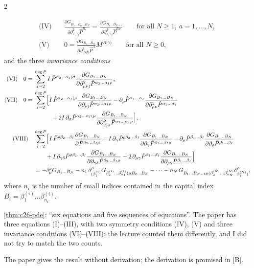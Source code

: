 \begin{paracol}{2}
\begin{theorem}
\begin{align*}
\text{(IV)}\quad&\frac{\partial G_{B_1\dots\widetilde{B_a}\dots B_N}}{\partial\partial^2_{\gamma_1\gamma_2}\hat P^{B_a}}=\frac{\partial G_{B_1\dots B_{N-1}}}{\partial\partial^2_{\gamma_1\gamma_2}\hat P^{B_N}}\qquad\text{for all }N\ge1,\ a=1,\dots,N,\\
\text{(V)}\quad&0=\frac{\partial G_{B_1\dots B_N}}{\partial\partial^2_{(\alpha\beta|}\hat P^A}M^{A|\gamma)}\qquad\text{for all }N\ge0,
\end{align*}
and the three \emph{invariance conditions}
\begin{align*}
\text{(VI)}\quad0={}&\sum_{I=2}^{\deg P}I\,\hat P^{\alpha_2\dots\alpha_I(\sigma}\frac{\partial G_{B_1\dots B_N}}{\partial\partial^2_{\mu\nu)}\hat P^{\alpha_2\dots\alpha_I\rho}},\\
\text{(VII)}\quad0={}&\sum_{I=2}^{\deg P}\Bigl[I\,\hat P^{\alpha_2\dots\alpha_I(\mu}\frac{\partial G_{B_1\dots B_N}}{\partial\partial_{\nu)}\hat P^{\alpha_2\dots\alpha_I\rho}}-\partial_\rho\hat P^{\alpha_1\dots\alpha_I}\frac{\partial G_{B_1\dots B_N}}{\partial\partial^2_{\mu\nu}\hat P^{\alpha_1\dots\alpha_I}}\\
&\qquad\quad+2I\,\partial_\sigma\hat P^{\alpha_2\dots\alpha_I(\mu}\frac{\partial G_{B_1\dots B_N}}{\partial\partial^2_{\nu)\sigma}\hat P^{\alpha_2\dots\alpha_I\rho}}\Bigr],\\
\text{(VIII)}\quad&\sum_{I=2}^{\deg P}\Bigl[I\,\hat P^{\rho\beta_2\dots\beta_I}\frac{\partial G_{B_1\dots B_N}}{\partial\hat P^{\beta_2\dots\beta_I\mu}}+I\,\partial_\gamma\hat P^{\rho\beta_2\dots\beta_I}\frac{\partial G_{B_1\dots B_N}}{\partial\partial_\gamma\hat P^{\beta_2\dots\beta_I\mu}}-\partial_\mu\hat P^{\beta_1\dots\beta_I}\frac{\partial G_{B_1\dots B_N}}{\partial\partial_\rho\hat P^{\beta_1\dots\beta_I}}\\
&\qquad+I\,\partial_{\gamma\delta}\hat P^{\rho\beta_2\dots\beta_I}\frac{\partial G_{B_1\dots B_N}}{\partial\partial_{\gamma\delta}\hat P^{\beta_2\dots\beta_I\mu}}-2\,\partial_{\mu\gamma}\hat P^{\beta_1\dots\beta_I}\frac{\partial G_{B_1\dots B_N}}{\partial\partial_{\rho\gamma}\hat P^{\beta_1\dots\beta_I}}\Bigr]\\
&=-\delta^\rho_\mu G_{B_1\dots B_N}-n_1\,\delta^\rho_{(\beta^{(1)}_1}G_{\beta^{(1)}_2\dots\beta^{(1)}_{n_1})\mu B_2\dots B_N}-\dots-n_N\,G_{B_1\dots B_{N-1}\mu(\beta^{(N)}_2\dots\beta^{(N)}_{n_N}}\delta^\rho_{\beta^{(N)}_1)},
\end{align*}
where $n_i$ is the number of small indices contained in the capital index $B_i=\beta^{(i)}_1\dots\beta^{(i)}_{n_i}$.
\end{theorem}
\begin{recall}
\cref{thm:c26-pde}: ``six equations and five sequences of equations''. The paper has three equations (I)--(III), with two symmetry conditions (IV), (V) and three invariance conditions (VI)--(VIII); the lecture counted them differently, and I did not try to match the two counts.
\end{recall}
The paper gives the result without derivation; the derivation is promised in [B].


\end{paracol}
